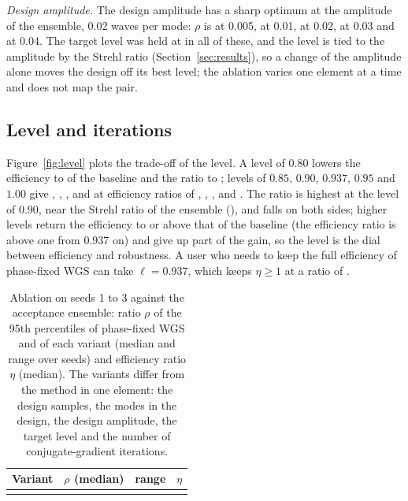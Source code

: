 \emph{Design amplitude.} The design amplitude has a sharp optimum at the amplitude of the ensemble, $0.02$ waves per mode: $\rho$ is \ablPriorAMed{} at 0.005, \ablPriorBMed{} at 0.01, \ablDefaultMed{} at 0.02, \ablPriorDMed{} at 0.03 and \ablPriorEMed{} at 0.04. The target level was held at \parLevel{} in all of these, and the level is tied to the amplitude by the Strehl ratio (Section~\ref{sec:results}), so a change of the amplitude alone moves the design off its best level; the
ablation varies one element at a time and does not map the pair.

\subsection{Level and iterations}

Figure~\ref{fig:level} plots the trade-off of the level. A level of $0.80$ lowers the efficiency to \ablLevelAEff{} of the baseline and the ratio to \ablLevelAMed; levels of $0.85$, $0.90$, $0.937$, $0.95$ and $1.00$ give \ablLevelBMed, \ablDefaultMed, \ablLevelDMed, \ablLevelEMed{} and \ablLevelFMed{} at efficiency ratios of \ablLevelBEff, \ablDefaultEff, \ablLevelDEff, \ablLevelEEff{} and \ablLevelFEff. The ratio is highest at the level of
$0.90$, near the Strehl ratio of the ensemble (\strehlExp), and falls on both sides; higher levels return the efficiency to or above that of the baseline (the efficiency ratio is above one from $0.937$ on) and give up part of the gain, so the level is the dial between efficiency and robustness. A user who needs to keep the full efficiency of phase-fixed WGS can take $\ell=0.937$, which keeps $\eta\ge1$ at a ratio of \ablLevelDMed.

\begin{table}[t]
\centering\small
\caption{Ablation on seeds 1 to 3 against the acceptance ensemble: ratio $\rho$ of the 95th percentiles of phase-fixed WGS and of each variant (median and range over seeds) and efficiency ratio $\eta$ (median). The variants differ from the method in one element: the design samples, the modes in the design, the design amplitude, the target level and the number of conjugate-gradient iterations.}
\label{tab:abl}
\begin{tabular}{@{}l r l r@{}}
\toprule
Variant & $\rho$ (median) & range & $\eta$\\
\midrule
\\
\bottomrule
\end{tabular}
\end{table}

